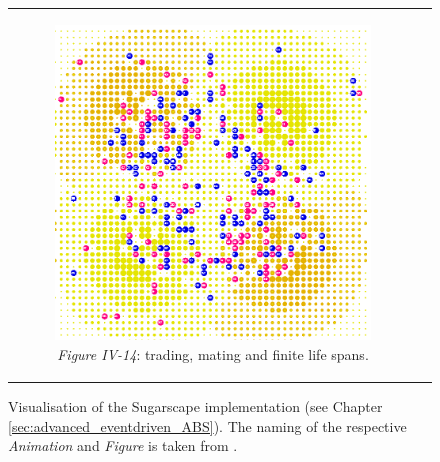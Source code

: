 \begin{figure}[H]
\begin{center}
\begin{tabular}{c c}
		\begin{subfigure}[b]{0.4\textwidth}
			\centering
			\includegraphics[width=1\textwidth, angle=0]{./fig/background/abs/sugarscape_trading_mating.png}
			\caption{\textit{Figure IV-14}: trading, mating and finite life spans.}
			\label{fig:sugarscape_visualisation_trading_mating}
		\end{subfigure}
	\end{tabular}
	
	\caption[Visualisation of the Sugarscape implementation]{Visualisation of the Sugarscape implementation (see Chapter \ref{sec:advanced_eventdriven_ABS}). The naming of the respective \textit{Animation} and \textit{Figure} is taken from \cite{epstein_growing_1996}.} 
	\label{fig:sugarscape_visualisation}
\end{center}
\end{figure}